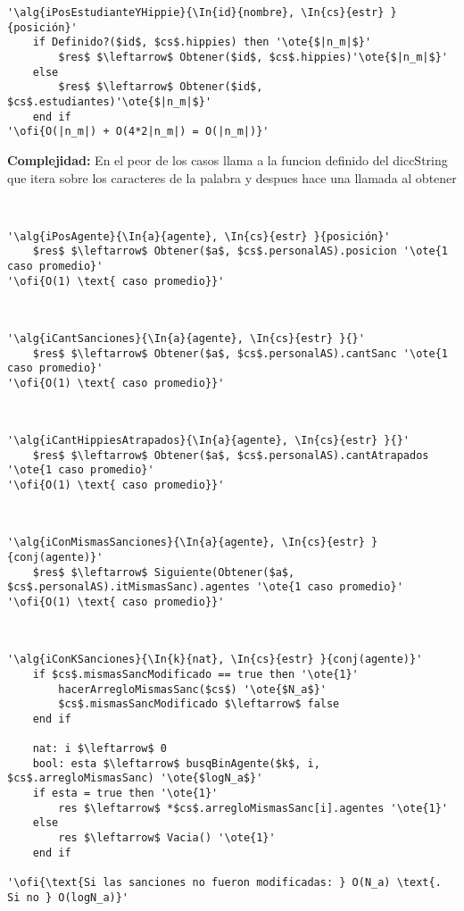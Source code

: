 \begin{lstlisting}[mathescape]
'\alg{iPosEstudianteYHippie}{\In{id}{nombre}, \In{cs}{estr} }{posición}'
	if Definido?($id$, $cs$.hippies) then '\ote{$|n_m|$}'
		$res$ $\leftarrow$ Obtener($id$, $cs$.hippies)'\ote{$|n_m|$}'
	else
		$res$ $\leftarrow$ Obtener($id$, $cs$.estudiantes)'\ote{$|n_m|$}'
	end if
'\ofi{O(|n_m|) + O(4*2|n_m|) = O(|n_m|)}'
\end{lstlisting}

\textbf{Complejidad:} En el peor de los casos llama a la funcion definido del diccString que itera sobre los caracteres de la palabra y despues hace una llamada al obtener

~


\begin{lstlisting}[mathescape]
'\alg{iPosAgente}{\In{a}{agente}, \In{cs}{estr} }{posición}'
	$res$ $\leftarrow$ Obtener($a$, $cs$.personalAS).posicion '\ote{1 caso promedio}'
'\ofi{O(1) \text{ caso promedio}}'
\end{lstlisting}

~


\begin{lstlisting}[mathescape]
'\alg{iCantSanciones}{\In{a}{agente}, \In{cs}{estr} }{}'
	$res$ $\leftarrow$ Obtener($a$, $cs$.personalAS).cantSanc '\ote{1 caso promedio}'
'\ofi{O(1) \text{ caso promedio}}'
\end{lstlisting}

~


\begin{lstlisting}[mathescape]
'\alg{iCantHippiesAtrapados}{\In{a}{agente}, \In{cs}{estr} }{}'
	$res$ $\leftarrow$ Obtener($a$, $cs$.personalAS).cantAtrapados '\ote{1 caso promedio}'
'\ofi{O(1) \text{ caso promedio}}'
\end{lstlisting}

~


\begin{lstlisting}[mathescape]
'\alg{iConMismasSanciones}{\In{a}{agente}, \In{cs}{estr} }{conj(agente)}'
	$res$ $\leftarrow$ Siguiente(Obtener($a$, $cs$.personalAS).itMismasSanc).agentes '\ote{1 caso promedio}'
'\ofi{O(1) \text{ caso promedio}}'
\end{lstlisting}

~


\begin{lstlisting}[mathescape]
'\alg{iConKSanciones}{\In{k}{nat}, \In{cs}{estr} }{conj(agente)}'
	if $cs$.mismasSancModificado == true then '\ote{1}'
		hacerArregloMismasSanc($cs$) '\ote{$N_a$}'
		$cs$.mismasSancModificado $\leftarrow$ false
	end if

	nat: i $\leftarrow$ 0
	bool: esta $\leftarrow$ busqBinAgente($k$, i, $cs$.arregloMismasSanc) '\ote{$logN_a$}'
	if esta = true then '\ote{1}'
		res $\leftarrow$ *$cs$.arregloMismasSanc[i].agentes '\ote{1}'
	else
		res $\leftarrow$ Vacia() '\ote{1}'
	end if

'\ofi{\text{Si las sanciones no fueron modificadas: } O(N_a) \text{. Si no } O(logN_a)}'
\end{lstlisting}

